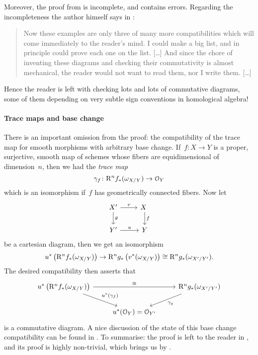 \documentclass[10pt,a4paper]{article}
\begin{document}
Moreover, the proof from \cite{hartshorne-residues-and-duality} is incomplete, and contains errors. Regarding the incompleteness the author himself says in \cite[\S II.5]{hartshorne-residues-and-duality}:
\begin{quote}
  Now these examples are only three of many more compatibilities which will come immediately to the reader's mind. I could make a big list, and in principle could prove each one on the list. [\ldots] And since the chore of inventing these diagrams and checking their commutativity is almost mechanical, the reader would not want to read them, nor I write them. [\ldots]
\end{quote}
Hence the reader is left with checking lots and lots of commutative diagrams, some of them depending on very subtle sign conventions in homological algebra!

\paragraph{Trace maps and base change}
There is an important omission from the proof: the compatibility of the trace map for smooth morphisms with arbitrary base change. If~$f\colon X\to Y$ is a proper, surjective, smooth map of schemes whose fibers are equidimensional of dimension~$n$, then we had the \emph{trace map} \cite[\S VII.4]{hartshorne-residues-and-duality}
\begin{equation}
  \gamma_f\colon\mathrm{R}^nf_*(\omega_{X/Y})\to\mathcal{O}_Y
\end{equation}
which is an isomorphism if~$f$ has geometrically connected fibers. Now let
\begin{equation}
  \begin{tikzcd}
    X' \arrow{r}{v} \arrow{d}{g} & X \arrow{d}{f} \\
    Y' \arrow{r}{u} & Y
  \end{tikzcd}
\end{equation}
be a cartesian diagram, then we get an isomorphism
\begin{equation}
  u^*\left( \mathrm{R}^nf_*(\omega_{X/Y}) \right)\to\mathrm{R}^ng_*\left( v^*(\omega_{X/Y}) \right)\cong\mathrm{R}^ng_*(\omega_{X'/Y'}).
\end{equation}
The desired compatibility then asserts that
\begin{equation}
  \begin{tikzcd}
    u^*\left( \RR^nf_*(\omega_{X/Y}) \right) \arrow{rr}{\cong} \arrow{rd}{u^*(\gamma_f)} & & \RR^ng_*(\omega_{X'/Y'}) \arrow{ld}{\gamma_{g}} \\
    & u^*(\mathcal{O}_Y)=\mathcal{O}_{Y'}
  \end{tikzcd}
\end{equation}
is a commutative diagram. A nice discussion of the state of this base change compatibility can be found in \cite[\S 1.1]{conrad-grothendieck-duality-and-base-change}. To summarise: the proof is left to the reader in \cite[\S VII.4]{hartshorne-residues-and-duality}, and its proof is highly non-trivial, which brings us by \cite{conrad-grothendieck-duality-and-base-change}.
\end{document}
